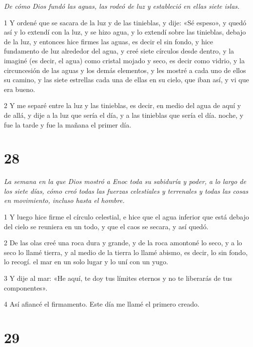 \par \textit{De cómo Dios fundó las aguas, las rodeó de luz y estableció en ellas siete islas.}

\par 1 Y ordené que se sacara de la luz y de las tinieblas, y dije: «Sé espeso», y quedó así y lo extendí con la luz, y se hizo agua, y lo extendí sobre las tinieblas, debajo de la luz, y entonces hice firmes las aguas, es decir el sin fondo, y hice fundamento de luz alrededor del agua, y creé siete círculos desde dentro, y la imaginé (es decir, el agua) como cristal mojado y seco, es decir como vidrio, y la circuncesión de las aguas y los demás elementos, y les mostré a cada uno de ellos su camino, y las siete estrellas cada una de ellas en su cielo, que iban así, y vi que era bueno.

\par 2 Y me separé entre la luz y las tinieblas, es decir, en medio del agua de aquí y de allá, y dije a la luz que sería el día, y a las tinieblas que sería el día. noche, y fue la tarde y fue la mañana el primer día.

\chapter{28}

\par \textit{La semana en la que Dios mostró a Enoc toda su sabiduría y poder, a lo largo de los siete días, cómo creó todas las fuerzas celestiales y terrenales y todas las cosas en movimiento, incluso hasta el hombre.}

\par 1 Y luego hice firme el círculo celestial, e hice que el agua inferior que está debajo del cielo se reuniera en un todo, y que el caos se secara, y así quedó.

\par 2 De las olas creé una roca dura y grande, y de la roca amontoné lo seco, y a lo seco lo llamé tierra, y al medio de la tierra lo llamé abismo, es decir, lo sin fondo, lo recogí. el mar en un solo lugar y lo uní con un yugo.

\par 3 Y dije al mar: «He aquí, te doy tus límites eternos y no te liberarás de tus componentes».

\par 4 Así afiancé el firmamento. Este día me llamé el primero creado.

\chapter{29}


